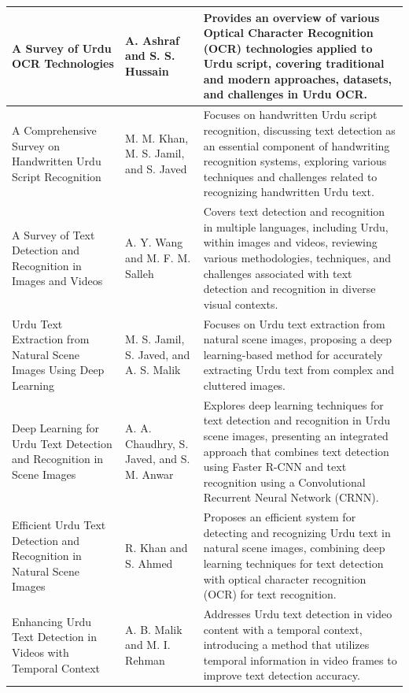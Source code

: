 \begin{center}
\begin{longtable}{|p{4cm}|p{4.5cm}|p{7.5cm}|}
A Survey of Urdu OCR Technologies & A. Ashraf and S. S. Hussain & Provides an overview of various Optical Character Recognition (OCR) technologies applied to Urdu script, covering traditional and modern approaches, datasets, and challenges in Urdu OCR. \\
\hline

A Comprehensive Survey on Handwritten Urdu Script Recognition & M. M. Khan, M. S. Jamil, and S. Javed & Focuses on handwritten Urdu script recognition, discussing text detection as an essential component of handwriting recognition systems, exploring various techniques and challenges related to recognizing handwritten Urdu text. \\
\hline

A Survey of Text Detection and Recognition in Images and Videos & A. Y. Wang and M. F. M. Salleh & Covers text detection and recognition in multiple languages, including Urdu, within images and videos, reviewing various methodologies, techniques, and challenges associated with text detection and recognition in diverse visual contexts.  \\
\hline

Urdu Text Extraction from Natural Scene Images Using Deep Learning & M. S. Jamil, S. Javed, and A. S. Malik & Focuses on Urdu text extraction from natural scene images, proposing a deep learning-based method for accurately extracting Urdu text from complex and cluttered images. \\
\hline

Deep Learning for Urdu Text Detection and Recognition in Scene Images & A. A. Chaudhry, S. Javed, and S. M. Anwar & Explores deep learning techniques for text detection and recognition in Urdu scene images, presenting an integrated approach that combines text detection using Faster R-CNN and text recognition using a Convolutional Recurrent Neural Network (CRNN). \\
\hline

Efficient Urdu Text Detection and Recognition in Natural Scene Images & R. Khan and S. Ahmed & Proposes an efficient system for detecting and recognizing Urdu text in natural scene images, combining deep learning techniques for text detection with optical character recognition (OCR) for text recognition. \\
\hline

Enhancing Urdu Text Detection in Videos with Temporal Context & A. B. Malik and M. I. Rehman & Addresses Urdu text detection in video content with a temporal context, introducing a method that utilizes temporal information in video frames to improve text detection accuracy. \\
\hline


\end{longtable}
\end{center}

